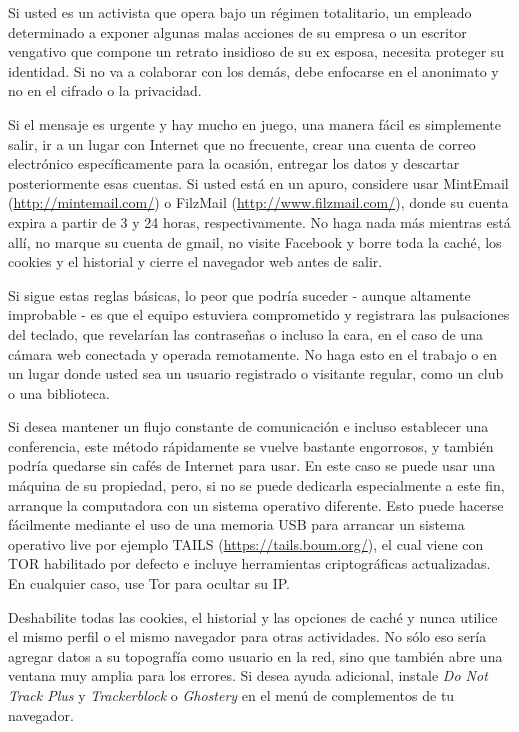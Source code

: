 \documentclass[10pt,a5paper,twoside,,]{book}
\begin{document}
Si usted es un activista que opera bajo un régimen totalitario, un
empleado determinado a exponer algunas malas acciones de su empresa o un
escritor vengativo que compone un retrato insidioso de su ex esposa,
necesita proteger su identidad. Si no va a colaborar con los demás, debe
enfocarse en el anonimato y no en el cifrado o la privacidad.

Si el mensaje es urgente y hay mucho en juego, una manera fácil es
simplemente salir, ir a un lugar con Internet que no frecuente, crear
una cuenta de correo electrónico específicamente para la ocasión,
entregar los datos y descartar posteriormente esas cuentas. Si usted
está en un apuro, considere usar MintEmail
(\href{http://www.mintemail.com/}{http://mintemail.com/}) o FilzMail
(\url{http://www.filzmail.com/}), donde su cuenta expira a partir de 3 y
24 horas, respectivamente. No haga nada más mientras está allí, no
marque su cuenta de gmail, no visite Facebook y borre toda la caché, los
cookies y el historial y cierre el navegador web antes de salir.

Si sigue estas reglas básicas, lo peor que podría suceder - aunque
altamente improbable - es que el equipo estuviera comprometido y
registrara las pulsaciones del teclado, que revelarían las contraseñas o
incluso la cara, en el caso de una cámara web conectada y operada
remotamente. No haga esto en el trabajo o en un lugar donde usted sea un
usuario registrado o visitante regular, como un club o una biblioteca.

Si desea mantener un flujo constante de comunicación e incluso
establecer una conferencia, este método rápidamente se vuelve bastante
engorrosos, y también podría quedarse sin cafés de Internet para usar.
En este caso se puede usar una máquina de su propiedad, pero, si no se
puede dedicarla especialmente a este fin, arranque la computadora con un
sistema operativo diferente. Esto puede hacerse fácilmente mediante el
uso de una memoria USB para arrancar un sistema operativo live por
ejemplo TAILS (\url{https://tails.boum.org/}), el cual viene con TOR
habilitado por defecto e incluye herramientas criptográficas
actualizadas. En cualquier caso, use Tor para ocultar su IP.

Deshabilite todas las cookies, el historial y las opciones de caché y
nunca utilice el mismo perfil o el mismo navegador para otras
actividades. No sólo eso sería agregar datos a su topografía como
usuario en la red, sino que también abre una ventana muy amplia para los
errores. Si desea ayuda adicional, instale \emph{Do Not Track Plus} y
\emph{Trackerblock} o \emph{Ghostery} en el menú de complementos de tu
navegador.
\end{document}
